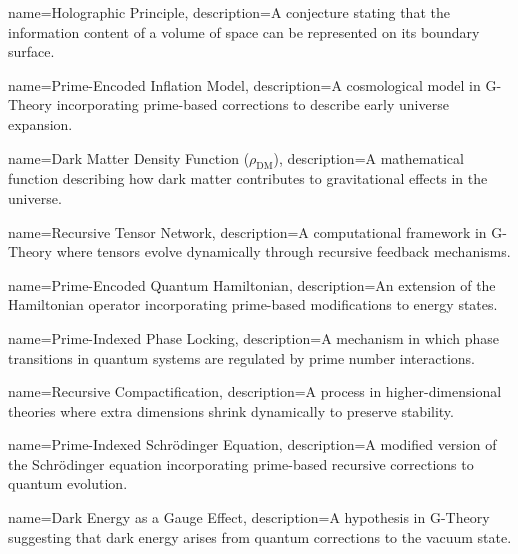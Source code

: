 {
    name={Holographic Principle},
    description={A conjecture stating that the information content of a volume of space can be represented on its boundary surface.}
}

{
    name={Prime-Encoded Inflation Model},
    description={A cosmological model in G-Theory incorporating prime-based corrections to describe early universe expansion.}
}

{
    name={Dark Matter Density Function (\(\rho_{\text{DM}}\))},
    description={A mathematical function describing how dark matter contributes to gravitational effects in the universe.}
}

{
    name={Recursive Tensor Network},
    description={A computational framework in G-Theory where tensors evolve dynamically through recursive feedback mechanisms.}
}

{
    name={Prime-Encoded Quantum Hamiltonian},
    description={An extension of the Hamiltonian operator incorporating prime-based modifications to energy states.}
}

{
    name={Prime-Indexed Phase Locking},
    description={A mechanism in which phase transitions in quantum systems are regulated by prime number interactions.}
}

{
    name={Recursive Compactification},
    description={A process in higher-dimensional theories where extra dimensions shrink dynamically to preserve stability.}
}

{
    name={Prime-Indexed Schrödinger Equation},
    description={A modified version of the Schrödinger equation incorporating prime-based recursive corrections to quantum evolution.}
}

{
    name={Dark Energy as a Gauge Effect},
    description={A hypothesis in G-Theory suggesting that dark energy arises from quantum corrections to the vacuum state.}
}
